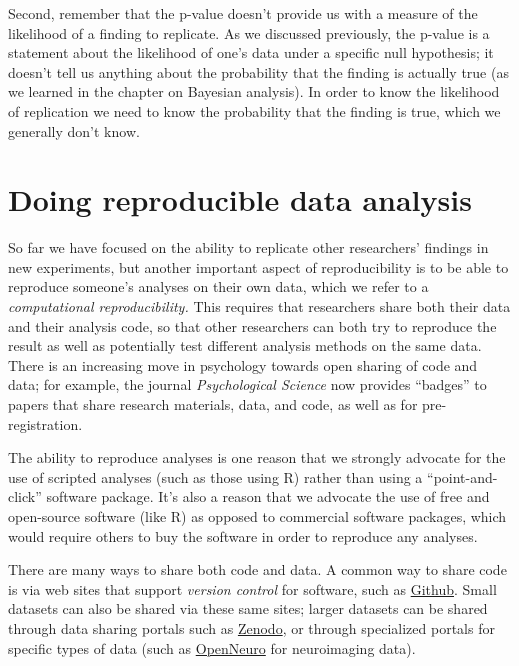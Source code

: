 \documentclass[
  12pt,
]{book}
\begin{document}
Second, remember that the p-value doesn't provide us with a measure of the likelihood of a finding to replicate. As we discussed previously, the p-value is a statement about the likelihood of one's data under a specific null hypothesis; it doesn't tell us anything about the probability that the finding is actually true (as we learned in the chapter on Bayesian analysis). In order to know the likelihood of replication we need to know the probability that the finding is true, which we generally don't know.

\hypertarget{doing-reproducible-data-analysis}{%
\section{Doing reproducible data analysis}\label{doing-reproducible-data-analysis}}

So far we have focused on the ability to replicate other researchers' findings in new experiments, but another important aspect of reproducibility is to be able to reproduce someone's analyses on their own data, which we refer to a \emph{computational reproducibility.} This requires that researchers share both their data and their analysis code, so that other researchers can both try to reproduce the result as well as potentially test different analysis methods on the same data. There is an increasing move in psychology towards open sharing of code and data; for example, the journal \emph{Psychological Science} now provides ``badges'' to papers that share research materials, data, and code, as well as for pre-registration.

The ability to reproduce analyses is one reason that we strongly advocate for the use of scripted analyses (such as those using R) rather than using a ``point-and-click'' software package. It's also a reason that we advocate the use of free and open-source software (like R) as opposed to commercial software packages, which would require others to buy the software in order to reproduce any analyses.

There are many ways to share both code and data. A common way to share code is via web sites that support \emph{version control} for software, such as \href{http://github.com}{Github}. Small datasets can also be shared via these same sites; larger datasets can be shared through data sharing portals such as \href{https://zenodo.org/}{Zenodo}, or through specialized portals for specific types of data (such as \href{http://openneuro.org}{OpenNeuro} for neuroimaging data).
\end{document}
